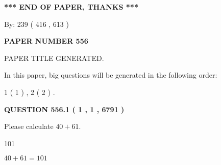 \documentclass[12pt]{article}
\begin{document}
   
\vspace{1.0in} 
{\textbf{\large{ *** END OF PAPER, THANKS *** }}} 
   
   
\hspace{1.0in} By: 
 239 ( 416 ,  613 )
   
   
   
   
\newpage 
\setcounter{page}{ 
   556001 } 
   
   
   
   
 {\textbf{ \Large{ PAPER NUMBER  556  }}}
   
   
\vspace{0.2in}
   
   
   
   
   
   
   
   
 \vspace{0.2in}
 
 
 
 
   
   
 PAPER TITLE GENERATED.
   
   
   
\vspace{0.2in}
   
In this paper, big questions will be generated in the following order: 
   
   
   1 ( 1 )
 ,
   2 ( 2 )
 .
  
\vspace{0.2in}
  
{\textbf{\Large{QUESTION
556.1 
 ( 1 , 1 , 6791 )
}}}
  
  
 
Please calculate $ %
40 +  %
61 $.
 
 
 
\noindent{}
 
 

101
 
 
\noindent{}
 
 

 
 
 
\noindent{}
 
 

$ %
40 +  %
61=   %
101$
 
\end{document}
